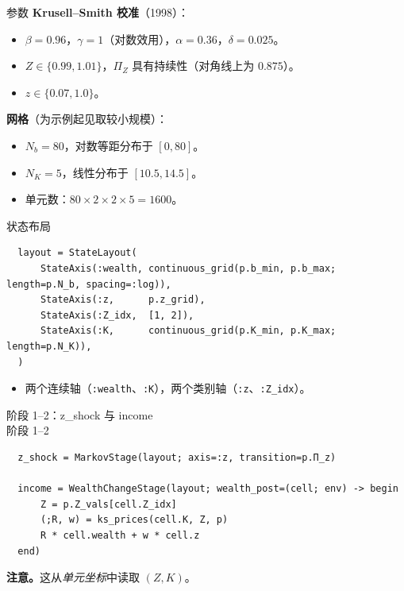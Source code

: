 \documentclass[10pt,aspectratio=169]{beamer}
\begin{document}
\begin{frame}{参数}
  \textbf{Krusell--Smith 校准}（1998）：
  \begin{itemize}
    \item $\beta = 0.96$，$\gamma = 1$（对数效用），$\alpha = 0.36$，$\delta = 0.025$。
    \item $Z \in \{0.99, 1.01\}$，$\Pi_Z$ 具有持续性（对角线上为 $0.875$）。
    \item $z \in \{0.07, 1.0\}$。
  \end{itemize}

  \textbf{网格}（为示例起见取较小规模）：
  \begin{itemize}
    \item $N_b = 80$，对数等距分布于 $[0, 80]$。
    \item $N_K = 5$，线性分布于 $[10.5, 14.5]$。
    \item 单元数：$80 \times 2 \times 2 \times 5 = 1600$。
  \end{itemize}
\end{frame}

\begin{frame}[fragile]{状态布局}
  \begin{lstlisting}
  layout = StateLayout(
      StateAxis(:wealth, continuous_grid(p.b_min, p.b_max; length=p.N_b, spacing=:log)),
      StateAxis(:z,      p.z_grid),
      StateAxis(:Z_idx,  [1, 2]),
      StateAxis(:K,      continuous_grid(p.K_min, p.K_max; length=p.N_K)),
  )
  \end{lstlisting}

  \begin{itemize}
    \item 两个连续轴（\texttt{:wealth}、\texttt{:K}），两个类别轴（\texttt{:z}、\texttt{:Z\_idx}）。
  \end{itemize}
\end{frame}

\begin{frame}[fragile]{阶段 1--2：z\_shock 与 income \\ 阶段 1--2}
  \begin{lstlisting}
  z_shock = MarkovStage(layout; axis=:z, transition=p.Π_z)

  income = WealthChangeStage(layout; wealth_post=(cell; env) -> begin
      Z = p.Z_vals[cell.Z_idx]
      (;R, w) = ks_prices(cell.K, Z, p)
      R * cell.wealth + w * cell.z
  end)
  \end{lstlisting}

  \textbf{注意。}这从\emph{单元坐标}中读取 $(Z, K)$。
\end{frame}
\end{document}
